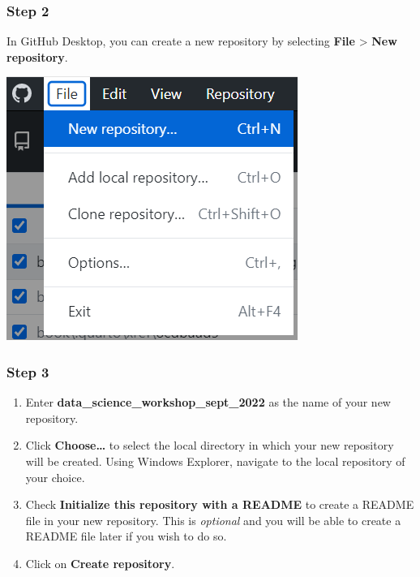 \documentclass[
  letterpaper,
  DIV=11,
  numbers=noendperiod,
  oneside]{scrreprt}
\providecommand{\tightlist}{%
  \setlength{\itemsep}{0pt}\setlength{\parskip}{0pt}}\usepackage{longtable,booktabs,array}
\begin{document}
\hypertarget{step-2}{%
\subsubsection{Step 2}\label{step-2}}

In GitHub Desktop, you can create a new repository by selecting
\textbf{File} \textgreater{} \textbf{New repository}.

\includegraphics{./images/paste-A85BE0C6.png}

\hypertarget{step-3}{%
\subsubsection{Step 3}\label{step-3}}

\begin{enumerate}
\def\labelenumi{\arabic{enumi}.}
\tightlist
\item
  Enter \textbf{data\_science\_workshop\_sept\_2022} as the name of your
  new repository.
\item
  Click \textbf{Choose\ldots{}} to select the local directory in which
  your new repository will be created. Using Windows Explorer, navigate
  to the local repository of your choice.
\item
  Check \textbf{Initialize this repository with a README} to create a
  README file in your new repository. This is \emph{optional} and you
  will be able to create a README file later if you wish to do so.
\item
  Click on \textbf{Create repository}.
\end{enumerate}
\end{document}

